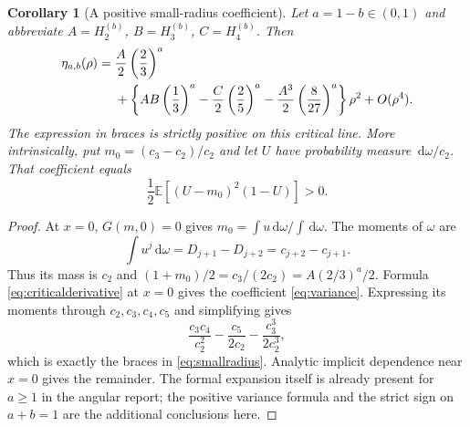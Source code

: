 \documentclass[11pt]{article}
\numberwithin{equation}{section}
\newtheorem{corollary}[theorem]{Corollary}
\theoremstyle{definition}\newtheorem{definition}[theorem]{Definition}
\theoremstyle{remark}\newtheorem{remark}[theorem]{Remark}
\newcommand{\dd}{\,\mathrm d}
\newcommand{\E}{\mathbb E}
\begin{document}
\begin{corollary}[A positive small-radius coefficient]\label{cor:smallradius}
Let $a=1-b\in(0,1)$ and abbreviate
$A=H_2^{(b)}$, $B=H_3^{(b)}$, $C=H_4^{(b)}$. Then
\begin{align}\label{eq:smallradius}
 \eta_{a,b}(\rho)={}&\frac A2\left(\frac23\right)^a\notag\\
 &+\left\{AB\left(\frac13\right)^a
   -\frac C2\left(\frac25\right)^a
   -\frac{A^3}{2}\left(\frac8{27}\right)^a\right\}\rho^2
 +O(\rho^4).
\end{align}
The expression in braces is strictly positive on this critical line.
More intrinsically, put
$m_0=(c_3-c_2)/c_2$ and let $U$ have probability measure
$\dd\omega/c_2$. That coefficient equals
\begin{equation}\label{eq:variance}
 \frac12\E[(U-m_0)^2(1-U)]>0.
\end{equation}
\end{corollary}
\begin{proof}
At $x=0$, $G(m,0)=0$ gives $m_0=\int u\dd\omega/\int\dd\omega$.
The moments of $\omega$ are
\[
 \int u^j\dd\omega=D_{j+1}-D_{j+2}=c_{j+2}-c_{j+1}.
\]
Thus its mass is $c_2$ and
$(1+m_0)/2=c_3/(2c_2)=A(2/3)^a/2$.
Formula \eqref{eq:criticalderivative} at $x=0$ gives the coefficient
\eqref{eq:variance}. Expressing its moments through $c_2,c_3,c_4,c_5$
and simplifying gives
\[
 \frac{c_3c_4}{c_2^2}-\frac{c_5}{2c_2}
       -\frac{c_3^3}{2c_2^3},
\]
which is exactly the braces in \eqref{eq:smallradius}.
Analytic implicit dependence near $x=0$ gives the remainder.
The formal expansion itself is already present for $a\ge1$ in the
angular report; the positive variance formula and the strict sign
on $a+b=1$ are the additional conclusions here.
\end{proof}
\end{document}
